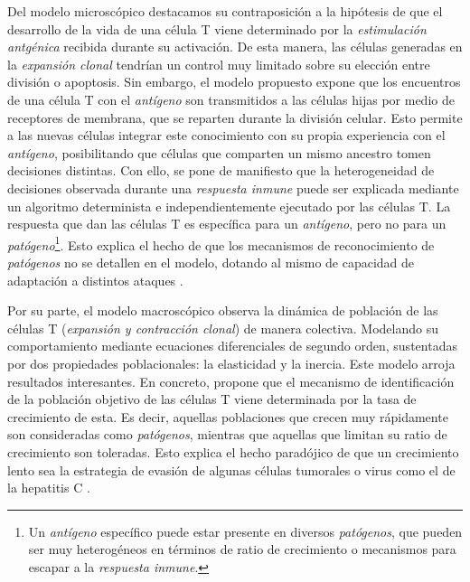 Del modelo microscópico destacamos su contraposición a la hipótesis de que el desarrollo de la vida de una célula T viene determinado por la \textit{estimulación antgénica} recibida durante su activación. De esta manera, las células generadas en la \textit{expansión clonal} tendrían un control muy limitado sobre su elección entre división o apoptosis. Sin embargo, el modelo propuesto expone que los encuentros de una célula T con el \textit{antígeno} son transmitidos a las células hijas por medio de receptores de membrana, que se reparten durante la división celular. Esto permite a las nuevas células integrar este conocimiento con su propia experiencia con el \textit{antígeno}, posibilitando que células que comparten un mismo ancestro tomen decisiones distintas. Con ello, se pone de manifiesto que la heterogeneidad de decisiones observada durante una \textit{respuesta inmune} puede ser explicada mediante un algoritmo determinista e independientemente ejecutado por las células T. La respuesta que dan las células T es específica para un \textit{antígeno}, pero no para un \textit{patógeno}\footnote{Un \textit{antígeno} específico puede estar presente en diversos \textit{patógenos}, que pueden ser muy heterogéneos en términos de ratio de crecimiento o mecanismos para escapar a la \textit{respuesta inmune}.}. Esto explica el hecho de que los mecanismos de reconocimiento de \textit{patógenos} no se detallen en el modelo, dotando al mismo de capacidad de adaptación a distintos ataques \citep{JTB}.

Por su parte, el modelo macroscópico observa la dinámica de población de las células T (\textit{expansión y contracción clonal}) de manera colectiva. Modelando su comportamiento mediante ecuaciones diferenciales de segundo orden, sustentadas por dos propiedades poblacionales: la elasticidad y la inercia. Este modelo arroja resultados interesantes. En concreto, propone que el mecanismo de identificación de la población objetivo de las células T viene determinada por la tasa de crecimiento de esta. Es decir, aquellas poblaciones que crecen muy rápidamente son consideradas como \textit{patógenos}, mientras que aquellas que limitan su ratio de crecimiento son toleradas. Esto explica el hecho paradójico de que un crecimiento lento sea la estrategia de evasión de algunas células tumorales o virus como el de la hepatitis C \citep{arias2015growth}. 


